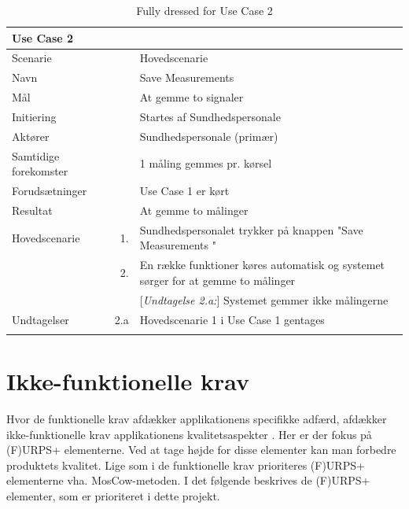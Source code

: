 \begin{longtabu} to  %
	{\large \textbf{Use Case 2 }} && \\
	\toprule
	Scenarie 				&&	Hovedscenarie\\
	Navn 					&& 	Save Measurements\\
	Mål 					&& 	At gemme to signaler  \\
	Initiering 				&& 	Startes af Sundhedspersonale\\
	Aktører 				&& 	Sundhedspersonale (primær)\\

	Samtidige forekomster  	&& 	1 måling gemmes pr. kørsel  \\
	Forudsætninger 			&&	Use Case 1 er kørt \\ 
	Resultat 				&& At gemme to målinger \\ \midrule
	Hovedscenarie 			&    1. 	&	Sundhedspersonalet trykker på knappen "Save Measurements "\\				 	
							&    2. 	& 	En række funktioner køres automatisk og systemet sørger for at gemme to målinger\\
							
	&&[\textit{Undtagelse 2.a:}] Systemet gemmer  ikke målingerne\\ \midrule							
							
	Undtagelser 			&		2.a	& 	Hovedscenarie 1 i Use Case 1 gentages  \\ \bottomrule
	
	\caption{Fully dressed for Use Case 2}
	\label{UC2}
\end{longtabu}


\pagebreak



\section{Ikke-funktionelle krav}
Hvor de funktionelle krav afdækker applikationens specifikke adfærd, afdækker ikke-funktionelle krav applikationens kvalitetsaspekter  \cite{ISELektioner}. Her er der fokus på (F)URPS+ elementerne. Ved at tage højde for disse elementer kan man forbedre produktets kvalitet. Lige som i de funktionelle krav prioriteres (F)URPS+ elementerne vha. MosCow-metoden. I det følgende beskrives de (F)URPS+ elementer, som er prioriteret i dette projekt.  



